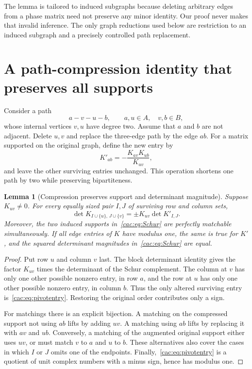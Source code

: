 \documentclass[11pt]{article}
\numberwithin{equation}{section}
\newtheorem{lemma}[theorem]{Lemma}
\theoremstyle{definition}
\begin{document}
The lemma is tailored to induced subgraphs because deleting arbitrary edges from a phase matrix need not preserve any minor identity. Our proof never makes that invalid inference. The only graph reductions used below are restriction to an induced subgraph and a precisely controlled path replacement.

\section{A path-compression identity that preserves all supports}
\label{cac:sec:compression}

Consider a path
\[
 a-v-u-b,
 \qquad a,u\in A,\quad v,b\in B,
\]
whose internal vertices $v,u$ have degree two. Assume that $a$ and $b$ are not adjacent. Delete $u,v$ and replace the three-edge path by the edge $ab$. For a matrix supported on the original graph, define the new entry by
\begin{equation}
 K'_{ab}=-\frac{K_{av}K_{ub}}{K_{uv}},
 \label{cac:eq:pivotentry}
\end{equation}
and leave the other surviving entries unchanged. This operation shortens one path by two while preserving bipartiteness.

\begin{lemma}[Compression preserves support and determinant magnitude]
\label{cac:lem:compress}
Suppose $K_{uv}\ne0$. For every equally sized pair $I,J$ of surviving row and column sets,
\begin{equation}
 \det K_{I\cup\{u\},\,J\cup\{v\}}
   =\pm K_{uv}\det K'_{I,J}.
 \label{cac:eq:Schur}
\end{equation}
Moreover, the two induced supports in~\eqref{cac:eq:Schur} are perfectly matchable simultaneously. If all edge entries of $K$ have modulus one, the same is true for $K'$, and the squared determinant magnitudes in~\eqref{cac:eq:Schur} are equal.
\end{lemma}
\begin{proof}
Put row $u$ and column $v$ last. The block determinant identity gives the factor $K_{uv}$ times the determinant of the Schur complement. The column at $v$ has only one other possible nonzero entry, in row $a$, and the row at $u$ has only one other possible nonzero entry, in column $b$. Thus the only altered surviving entry is~\eqref{cac:eq:pivotentry}. Restoring the original order contributes only a sign.

For matchings there is an explicit bijection. A matching on the compressed support not using $ab$ lifts by adding $uv$. A matching using $ab$ lifts by replacing it with $av$ and $ub$. Conversely, a matching of the augmented original support either uses $uv$, or must match $v$ to $a$ and $u$ to $b$. These alternatives also cover the cases in which $I$ or $J$ omits one of the endpoints. Finally,~\eqref{cac:eq:pivotentry} is a quotient of unit complex numbers with a minus sign, hence has modulus one.
\end{proof}
\end{document}

